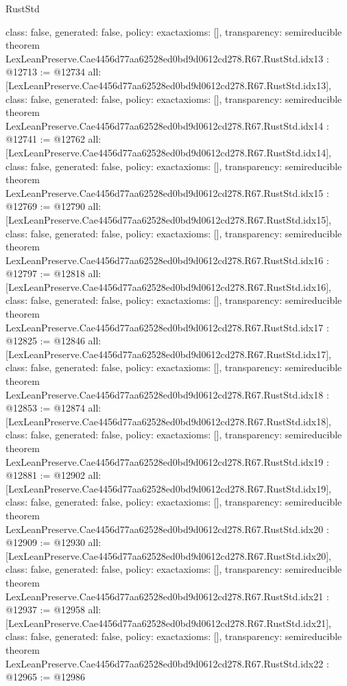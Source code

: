 \begin{lexlean}{RustStd}
\begin{coremodule}
{  class: false,
  generated: false,
  policy: exact{axioms: []},
  transparency: semireducible
}
theorem LexLeanPreserve.Cae4456d77aa62528ed0bd9d0612cd278.R67.RustStd.idx13 : @12713 := @12734 {
  all: [LexLeanPreserve.Cae4456d77aa62528ed0bd9d0612cd278.R67.RustStd.idx13],
  class: false,
  generated: false,
  policy: exact{axioms: []},
  transparency: semireducible
}
theorem LexLeanPreserve.Cae4456d77aa62528ed0bd9d0612cd278.R67.RustStd.idx14 : @12741 := @12762 {
  all: [LexLeanPreserve.Cae4456d77aa62528ed0bd9d0612cd278.R67.RustStd.idx14],
  class: false,
  generated: false,
  policy: exact{axioms: []},
  transparency: semireducible
}
theorem LexLeanPreserve.Cae4456d77aa62528ed0bd9d0612cd278.R67.RustStd.idx15 : @12769 := @12790 {
  all: [LexLeanPreserve.Cae4456d77aa62528ed0bd9d0612cd278.R67.RustStd.idx15],
  class: false,
  generated: false,
  policy: exact{axioms: []},
  transparency: semireducible
}
theorem LexLeanPreserve.Cae4456d77aa62528ed0bd9d0612cd278.R67.RustStd.idx16 : @12797 := @12818 {
  all: [LexLeanPreserve.Cae4456d77aa62528ed0bd9d0612cd278.R67.RustStd.idx16],
  class: false,
  generated: false,
  policy: exact{axioms: []},
  transparency: semireducible
}
theorem LexLeanPreserve.Cae4456d77aa62528ed0bd9d0612cd278.R67.RustStd.idx17 : @12825 := @12846 {
  all: [LexLeanPreserve.Cae4456d77aa62528ed0bd9d0612cd278.R67.RustStd.idx17],
  class: false,
  generated: false,
  policy: exact{axioms: []},
  transparency: semireducible
}
theorem LexLeanPreserve.Cae4456d77aa62528ed0bd9d0612cd278.R67.RustStd.idx18 : @12853 := @12874 {
  all: [LexLeanPreserve.Cae4456d77aa62528ed0bd9d0612cd278.R67.RustStd.idx18],
  class: false,
  generated: false,
  policy: exact{axioms: []},
  transparency: semireducible
}
theorem LexLeanPreserve.Cae4456d77aa62528ed0bd9d0612cd278.R67.RustStd.idx19 : @12881 := @12902 {
  all: [LexLeanPreserve.Cae4456d77aa62528ed0bd9d0612cd278.R67.RustStd.idx19],
  class: false,
  generated: false,
  policy: exact{axioms: []},
  transparency: semireducible
}
theorem LexLeanPreserve.Cae4456d77aa62528ed0bd9d0612cd278.R67.RustStd.idx20 : @12909 := @12930 {
  all: [LexLeanPreserve.Cae4456d77aa62528ed0bd9d0612cd278.R67.RustStd.idx20],
  class: false,
  generated: false,
  policy: exact{axioms: []},
  transparency: semireducible
}
theorem LexLeanPreserve.Cae4456d77aa62528ed0bd9d0612cd278.R67.RustStd.idx21 : @12937 := @12958 {
  all: [LexLeanPreserve.Cae4456d77aa62528ed0bd9d0612cd278.R67.RustStd.idx21],
  class: false,
  generated: false,
  policy: exact{axioms: []},
  transparency: semireducible
}
theorem LexLeanPreserve.Cae4456d77aa62528ed0bd9d0612cd278.R67.RustStd.idx22 : @12965 := @12986 {
}
\end{coremodule}
\end{lexlean}
